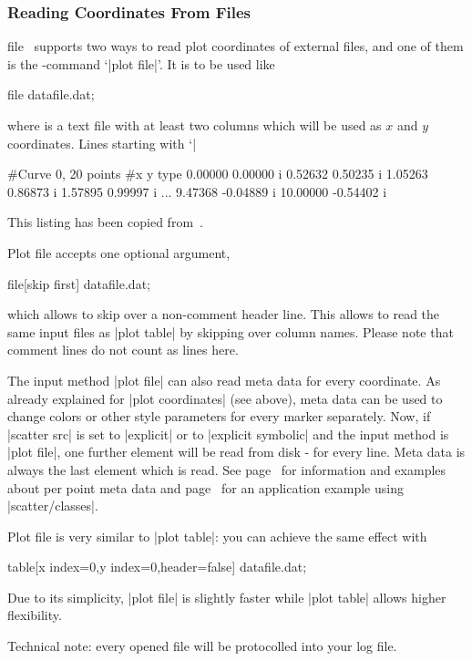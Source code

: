 \subsubsection{Reading Coordinates From Files}

\begin{addplotoperation}[]{file}{}
\label{pgfplots:addplot:file}
\PGFPlots\ supports two ways to read plot coordinates of external files, and one of them is the \Tikz-command `|plot file|'. It is to be used like
\begin{codeexample}
\addplot file {datafile.dat};
\end{codeexample}
where  is a text file with at least two columns which will be used as $x$ and $y$ coordinates. Lines starting with `|%
\begin{codeexample}
#Curve 0, 20 points
#x y type
0.00000 0.00000 i
0.52632 0.50235 i
1.05263 0.86873 i
1.57895 0.99997 i
...
9.47368 -0.04889 i
10.00000 -0.54402 i
\end{codeexample}
This listing has been copied from~\cite[section~16.4]{tikz}.

Plot file accepts one optional argument,

\begin{codeexample}
\addplot file[skip first] {datafile.dat};
\end{codeexample}

\noindent
which allows to skip over a non-comment header line. This allows to read the same input files as |plot table| by skipping over column names. Please note that comment lines do not count as lines here.

The input method |plot file| can also read meta data for every coordinate. As already explained for |plot coordinates| (see above), meta data can be used to change colors or other style parameters for every marker separately. Now, if |scatter src| is set to |explicit| or to |explicit symbolic| and the input method is |plot file|, one further element will be read from disk - for every line. Meta data is always the last element which is read. See page~\pageref{pgfplots:scatter:src} for information and examples about per point meta data and page~\pageref{pgfplots:scatterclasses} for an application example using |scatter/classes|.


Plot file is very similar to |plot table|: you can achieve the same effect with
\begin{codeexample}
\addplot table[x index=0,y index=0,header=false] {datafile.dat};
\end{codeexample}
\noindent Due to its simplicity, |plot file| is slightly faster while |plot table| allows higher flexibility.

Technical note: every opened file will be protocolled into your log file.
\end{addplotoperation}


